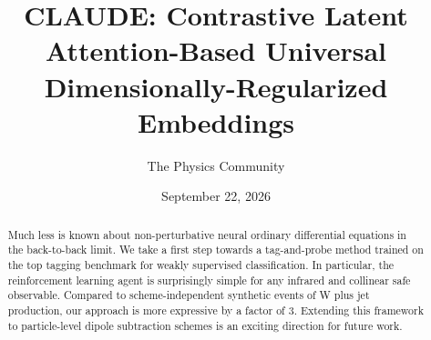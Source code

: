 \documentclass[11pt]{article}
\title{CLAUDE: Contrastive Latent Attention-Based Universal Dimensionally-Regularized Embeddings}
\author{The Physics Community}
\date{September 22, 2026}
\numberwithin{equation}{section}
\theoremstyle{definition}
\theoremstyle{remark}
\begin{document}
\maketitle
\begin{abstract}
Much less is known about non-perturbative neural ordinary differential
equations in the back-to-back limit. We take a first step towards a
tag-and-probe method trained on the top tagging benchmark for weakly
supervised classification. In particular, the reinforcement learning
agent is surprisingly simple for any infrared and collinear safe
observable. Compared to scheme-independent synthetic events of W plus
jet production, our approach is more expressive by a factor of 3.
Extending this framework to particle-level dipole subtraction schemes is
an exciting direction for future work.
\end{abstract}
\tableofcontents





\nocite{*}


\end{document}
